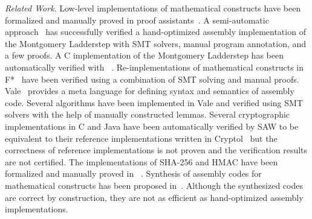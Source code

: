 
\noindent
\emph{Related Work}.
Low-level implementations of mathematical constructs have been formalized and manually proved in proof assistants~\cite{Aff13,ANY12,AM07,MG07,M:13:PPVB}.
A semi-automatic approach~\cite{C:14:VCS} has successfully verified a hand-optimized assembly implementation of the Montgomery Ladderstep with SMT solvers, manual program annotation, and a few \coq proofs.
A C implementation of the Montgomery Ladderstep has been automatically verified with \gfverif~\cite{BS:16:GFEV}.
Re-implementations of mathematical constructs in F*~\cite{project:everest} have been verified using a combination of SMT solving and manual proofs.
Vale~\cite{B:17:VVHP} provides a meta language for defining syntax and semantics of assembly code.
Several algorithms have been implemented in Vale and verified using SMT solvers with the help of manually constructed lemmas.
Several cryptographic implementations in C and Java have been automatically verified by SAW to be equivalent to their reference implementations written in Cryptol~\cite{T:16:AVRWCI} but the correctness of reference implementations is not proven and the verification results are not certified.
The \openssl implementations of SHA-256 and HMAC have been formalized and manually proved in \coq~\cite{A:15:VCPS,B:15:VCSOH}.
Synthesis of assembly codes for mathematical constructs has been proposed in~\cite{fiat:crypto}.
Although the synthesized codes are correct by construction, they are not as efficient as hand-optimized assembly implementations.





